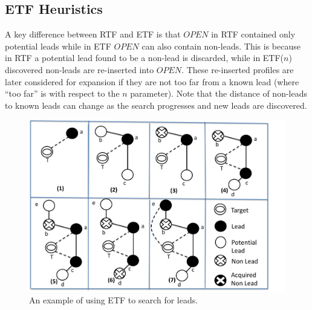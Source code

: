 \documentclass[journal]{IEEEtran}
\begin{document}
\subsection{ETF Heuristics}
A key difference between RTF and ETF is that $OPEN$ in RTF contained only potential leads while in ETF $OPEN$ can also contain non-leads. This is because in RTF a potential lead found to be a non-lead is discarded, while in ETF($n$) discovered non-leads are re-inserted into $OPEN$. These re-inserted profiles are later considered for expansion if they are not too far from a known lead (where ``too far'' is with respect to the $n$ parameter). %
Note that the distance of non-leads to known leads can change as the search progresses and new leads are discovered.

\begin{figure}[t!]

  \centering
	 \includegraphics[width=0.85\linewidth]{process-and-legend-new.jpg}
  \caption{An example of using ETF to search for leads.}\label{fig:etf_process-and-legend}
\end{figure}
\end{document}
